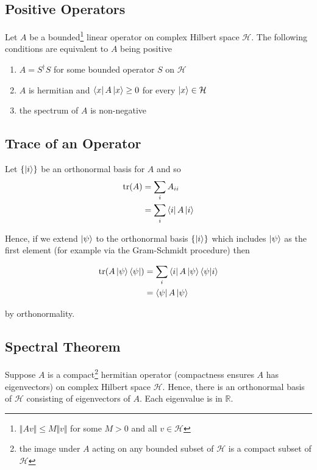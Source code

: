 \documentclass[11pt]{article}
\newcommand\0{\mathbf{0}}
\newcommand\RR{\mathbb{R}}
\newcommand\<{\langle}
\renewcommand\>{\rangle}
\begin{document}
\subsection{Positive Operators}\label{posop}
Let $A$ be a bounded\footnote{$\Vert Av \Vert \leq M\Vert v \Vert$ for some $M>0$ and all $v \in \mathcal{H}$} linear operator on complex Hilbert space $\mathcal{H}$. The following conditions are equivalent to $A$ being positive

\begin{enumerate}
\item $A=S^\dag S$ for some bounded operator $S$ on $\mathcal{H}$
\item $A$ is hermitian and $\bra{x} A \ket{x} \geq 0$ for every $\ket{x} \in \mathcal{H}$
\item the spectrum of $A$ is non-negative
\end{enumerate}

\subsection{Trace of an Operator}\label{trop}

Let $\{\ket{i}\}$ be an orthonormal basis for $A$ and so
\begin{align*}
\tr(A) &= \sum_i A_{ii} \\
&= \sum_i \bra{i} A \ket{i}	
\end{align*}

Hence, if we extend $\ket{\psi}$ to the orthonormal basis $\{\ket{i}\}$ which includes $\ket{\psi}$ as the first element (for example via the Gram-Schmidt procedure) then

\begin{align*}
	\tr(A\ket{\psi}\bra{\psi}) &= \sum_i \bra{i} A\ket{\psi}\bra{\psi}\ket{i}	 \\
	&= \bra{\psi} A\ket{\psi}
\end{align*}

by orthonormality.

\subsection{Spectral Theorem}
Suppose $A$ is a compact\footnote{the image under $A$ acting on any bounded subset of $\mathcal{H}$ is a compact subset of $\mathcal{H}$} hermitian operator (compactness ensures $A$ has eigenvectors) on complex Hilbert space $\mathcal{H}$. Hence, there is an orthonormal basis of $\mathcal{H}$ consisting of eigenvectors of $A$. Each eigenvalue is in $\RR$.

\nocite{*}


\end{document}
